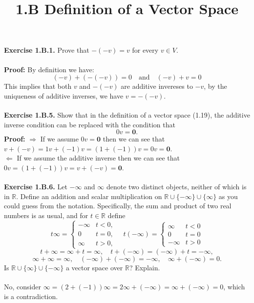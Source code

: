 \documentclass{article}
\title{\textbf{1.B Definition of a Vector Space}}
\begin{document}
	\maketitle
	\textbf{Exercise 1.B.1.} Prove that $-(-v) = v$ for every $v \in V$. \\ \\
	\textbf{Proof:} By definition we have:
		$$(-v) + (-(-v)) = 0 \quad \text{and} \quad (-v) + v = 0$$
	This implies that both $v$ and $-(-v)$ are additive invereses to $-v$, by the uniqueness of additive inverses, we have $v = -(-v)$. \\ \\
	\textbf{Exercise 1.B.5.} Show that in the definition of a vector space (1.19), the additive inverse condition can be replaced with the condition that 
		$$0v = \mathbf{0}.$$
		\textbf{Proof:} $\Longrightarrow$ If we assume $0v = \mathbf{0}$ then we can see that $v + (-v) = 1v + (-1)v = (1 + (-1))v = 0v = \mathbf{0}$.\\ 
		$\Longleftarrow$ If we assume the additive inverse then we can see that $0v = (1 + (-1))v = v + (-v) = \mathbf{0}$. \\ \\
	\textbf{Exercise 1.B.6.} Let $-\infty$ and $\infty$ denote two distinct objects, neither of which is in $\mathbb{R}$. Define an addition and scalar multiplication on $\mathbb{R} \cup \{-\infty\} \cup \{\infty\}$ as you could guess from the notation. Specifically, the sum and product of two real numbers is as usual, and for $t \in \mathbb{R}$ define
		$$t\infty =
			\begin{cases}
				-\infty & t < 0, \\
				0 & t = 0, \\
				\infty & t > 0,
			\end{cases} \quad
		t(-\infty) =
			\begin{cases}
				\infty & t < 0 \\
				0 & t = 0 \\
				-\infty & t > 0
			\end{cases}$$
		$$t + \infty = \infty + t = \infty, \quad t + (-\infty) = (-\infty) + t = -\infty,$$
		$$\infty + \infty = \infty, \quad (-\infty) + (-\infty) = -\infty, \quad \infty + (-\infty) = 0.$$
	Is $\mathbb{R} \cup \{\infty\} \cup \{-\infty\}$ a vector space over $\mathbb{R}$? Explain. \\ \\
	No, consider $\infty = (2 + (-1))\infty = 2\infty + (-\infty) = \infty + (-\infty) = 0$, which is a contradiction.
\end{document}
